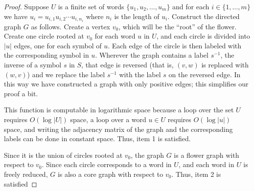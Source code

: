 \documentclass{article}
\begin{document}
\begin{proof}
  Suppose $U$ is a finite set of words $\{u_1, u_2, \dotsc, u_m\}$ and for each $i \in \{1, \dotsc, m\}$ we have $u_i = u_{i, 1}u_{i, 2}\dotsb u_{i, n_i}$ where $n_i$ is the length of $u_i$.
  Construct the directed graph $G$ as follows.
  Create a vertex $v_0$, which will be the ``root'' of the flower.
  Create one circle rooted at $v_0$ for each word $u$ in $U$, and each circle is divided into $|u|$ edges, one for each symbol of $u$.
  Each edge of the circle is then labeled with the corresponding symbol in $u$.
  Wherever the graph contains a label $s^{-1}$, the inverse of a symbol $s$ in $S$, that edge is reversed (that is, $(v, w)$ is replaced with $(w, v)$) and we replace the label $s^{-1}$ with the label $s$ on the reversed edge.
  In this way we have constructed a graph with only positive edges; this simplifies our proof a bit.

  This function is computable in logarithmic space because a loop over the set $U$ requires $O(\log |U|)$ space, a loop over a word $u \in U$ requires $O(\log |u|)$ space, and writing the adjacency matrix of the graph and the corresponding labels can be done in constant space.
  Thus, item 1 is satisfied.

  Since it is the union of circles rooted at $v_0$, the graph $G$ is a flower graph with respect to $v_0$.
  Since each circle corresponds to a word in $U$, and each word in $U$ is freely reduced, $G$ is also a core graph with respect to $v_0$.
  Thus, item 2 is satisfied


\end{proof}
\end{document}
